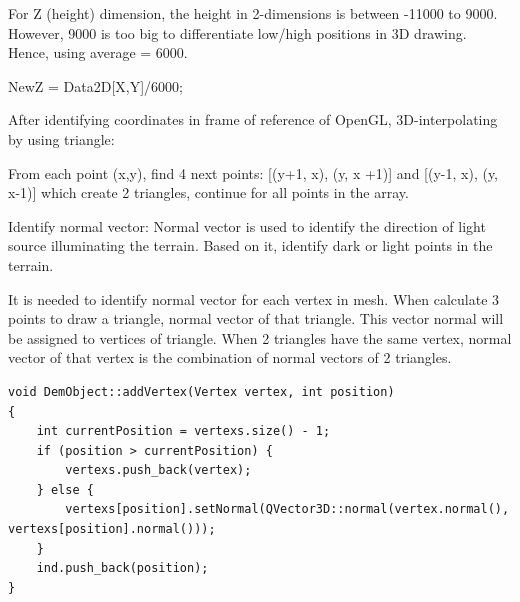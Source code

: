 \documentclass[11pt]{article}
\begin{document}
\begin{itemize}
For Z (height) dimension, the height in 2-dimensions is between -11000 to 9000. However,  9000 is too big to differentiate low/high positions in 3D drawing. Hence, using average = 6000.

NewZ = Data2D[X,Y]/6000;

After identifying coordinates in frame of reference of OpenGL, 3D-interpolating by using triangle:

From each point (x,y), find 4 next points: [(y+1, x), (y, x +1)] and [(y-1, x), (y, x-1)] which create 2 triangles, continue for all points in the array.

Identify normal vector: 
Normal vector is used to identify the direction of light source illuminating the terrain. Based on it, identify dark or light points in the terrain.

It is needed to identify normal vector for each vertex in mesh. When calculate 3 points  to draw a triangle, normal vector of that triangle. This vector normal will be assigned to vertices of triangle.
When 2 triangles have the same vertex, normal vector of that vertex is the combination of normal vectors of 2 triangles.
\begin{lstlisting}[breaklines=true]
void DemObject::addVertex(Vertex vertex, int position)
{
    int currentPosition = vertexs.size() - 1;
    if (position > currentPosition) {
        vertexs.push_back(vertex);        
    } else {
        vertexs[position].setNormal(QVector3D::normal(vertex.normal(), vertexs[position].normal()));
    }
    ind.push_back(position);
}
\end{lstlisting}


\end{itemize}
\end{document}
